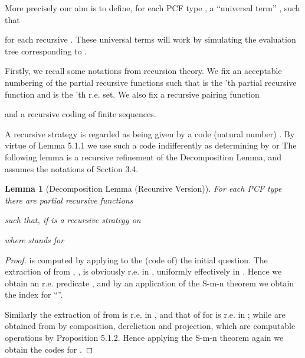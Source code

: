 \documentclass[11pt]{article}
\newtheorem{lemma}[theorem]{Lemma}
\newcommand{\lang}{\langle}
\newcommand{\rang}{\rangle}
\begin{document}
More precisely our aim is to define, for each PCF type , a
``universal term'' , such that


for each recursive . These universal terms will
work by simulating the evaluation tree corresponding to .

Firstly, we recall some notations from recursion theory. We fix an acceptable
numbering of the partial recursive functions \cite{SoareRI:recesd}
such that  is the 'th
partial recursive function and  is the 'th r.e. set. We also fix
a recursive pairing function

and a recursive coding of finite sequences.

A recursive strategy  is regarded as being given by a code
(natural number) . By virtue of Lemma 5.1.1
we use such a code indifferently as determining  by
 or
 The
following lemma is a recursive refinement of the Decomposition
Lemma, and assumes the notations of Section 3.4.


\newcommand{\casodue}[5] {  }

\newcommand{\casotre}[7] {  }



\begin{lemma}[Decomposition Lemma (Recursive Version)]
For each PCF type  there are partial recursive functions

such that, if  is a recursive strategy on 

\casotre{D_T\lceil\sigma\rceil}{\mbox{undefined,}}{\sigma=\bot_{\tilde{T}}}
{\lang 2,n\rang ,}{\sigma=K_{\tilde{T}}n}{\lang 3,i\rang ,}{R(\sigma)}
\casodue{H_T\lceil\sigma\rceil}{\lang \lceil\sigma_1\rceil,\dots,\lceil\sigma_{l_i}
\rceil\rang ,}{R(\sigma)}{\mbox{undefined},}{\mbox{otherwise}}
\casodue{B_T(\lceil\sigma\rceil,n)}{\lceil\tau_n\rceil,}{R(\sigma)}
{\mbox{undefined},}{\mbox{otherwise}}
where  stands for

\end{lemma}
\begin{proof}  is computed by applying
 to the (code of) the initial
question. The extraction of  from ,
, is obviously r.e. in
, uniformly effectively in . Hence we obtain an r.e.
predicate , and by an application
of the \textsf{S-m-n} theorem we obtain the index for
``''.

Similarly the extraction of  from  is r.e. in
, and that of  for  is r.e. in
; while  are obtained from
 by composition, dereliction and projection, which are
computable operations by Proposition 5.1.2. Hence applying the
\textsf{S-m-n} theorem again we obtain the codes for .
\end{proof}
\end{document}
